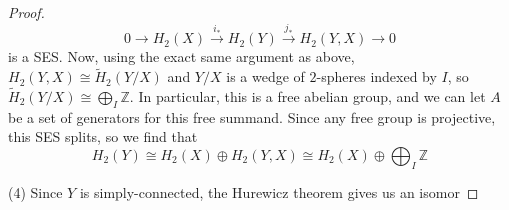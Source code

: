\documentclass[reqno]{amsart}
\theoremstyle{definition}
\theoremstyle{remark}
\begin{document}
\begin{proof}
    \[
    0 \to H_2 \left( X \right) \stackrel{i_*}{\to} 
    H_2 (Y) \stackrel{j_*}{\to}  H_2 (Y,X) \to 0
    \] 
    is a SES.
    Now, using the exact same argument as above,
    $H_2 \left( Y,X \right) \cong
    \tilde{H}_2 (Y /X)$ and $Y / X$ is a wedge of
    $2$-spheres indexed by $I$, so 
    $\tilde{H}_2 \left( Y / X \right) \cong
    \bigoplus_{I} \mathbb{Z}$.
    In particular, this is a free abelian group, and
    we can let $A$ be a set of generators
    for this free summand.
    Since any free group is projective,
    this SES splits, so we find that
    \[
    H_2 (Y) \cong H_2 (X) \oplus H_2 (Y,X)
    \cong H_2 (X) \oplus \bigoplus_{I} \mathbb{Z}
    \] 


    (4) Since $Y$ is simply-connected, the Hurewicz
    theorem gives us an isomor
    

 
    \end{proof}



\end{document}
